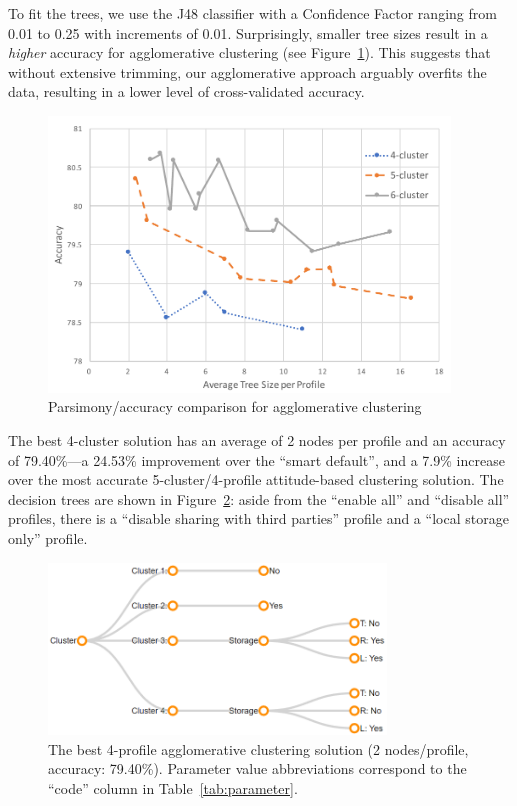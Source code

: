 To fit the trees, we use the J48 classifier with a Confidence Factor ranging from 0.01 to 0.25 with increments of 0.01. Surprisingly, smaller tree sizes result in a \emph{higher} accuracy for agglomerative clustering (see Figure~\ref{fig:conglosum}). This suggests that without extensive trimming, our agglomerative approach arguably overfits the data, resulting in a lower level of cross-validated accuracy.

\begin{figure}
	\centering
	\includegraphics[width=0.95\textwidth]{figures/congloSum2.pdf}
	\caption{Parsimony/accuracy comparison for agglomerative clustering}
	\label{fig:conglosum}
\end{figure}

The best 4-cluster solution has an average of 2 nodes per profile and an accuracy of 79.40\%---a 24.53\% improvement over the ``smart default'', and a 7.9\% increase over the most accurate 5-cluster/4-profile attitude-based clustering solution. The decision trees are shown in Figure~\ref{fig:conglo_4_profile001}: aside from the ``enable all'' and ``disable all'' profiles, there  is a ``disable sharing with third parties'' profile and a ``local storage only'' profile.

\begin{figure}
	\centering
	\includegraphics[width=0.8\textwidth]{figures/conglo_4_profile001.png}
	\caption{The best 4-profile agglomerative clustering solution (2 nodes/profile, accuracy: 79.40\%). Parameter value abbreviations correspond to the ``code'' column in Table~\ref{tab:parameter}.}
	\label{fig:conglo_4_profile001}
\end{figure}

